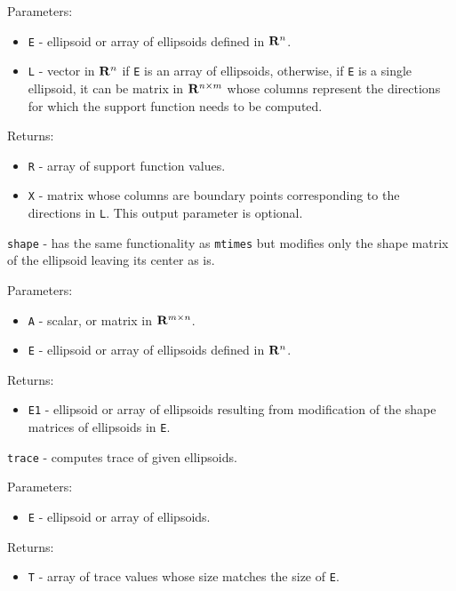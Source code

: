 \documentclass{report}
\begin{document}
Parameters:
\begin{itemize}
\item {\tt E} - ellipsoid or array of ellipsoids defined in ${\bf R}^n$.
\item {\tt L} - vector in ${\bf R}^n$ if {\tt E} is an array of ellipsoids,
otherwise, if {\tt E} is a single ellipsoid, it can be matrix in
${\bf R}^{n\times m}$ whose columns represent the directions for which
the support function needs to be computed.
\end{itemize}

Returns:
\begin{itemize}
\item {\tt R} - array of support function values.
\item {\tt X} - matrix whose columns are boundary points corresponding
to the directions in {\tt L}. This output parameter is optional.
\end{itemize}

\newpage

{\Large {\tt shape}} - has the same functionality as {\tt mtimes} but
modifies only the shape matrix of the ellipsoid leaving its center as is.

Parameters:
\begin{itemize}
\item {\tt A} - scalar, or matrix in ${\bf R}^{m\times n}$.
\item {\tt E} - ellipsoid or array of ellipsoids defined in ${\bf R}^n$.
\end{itemize}

Returns:
\begin{itemize}
\item {\tt E1} - ellipsoid or array of ellipsoids resulting from modification
of the shape matrices of ellipsoids in {\tt E}.
\end{itemize}



\newpage

{\Large {\tt trace}} - computes trace of given ellipsoids.

Parameters:
\begin{itemize}
\item {\tt E} - ellipsoid or array of ellipsoids.
\end{itemize}

Returns:
\begin{itemize}
\item {\tt T} - array of trace values whose size matches the size of {\tt E}.
\end{itemize}
\end{document}
